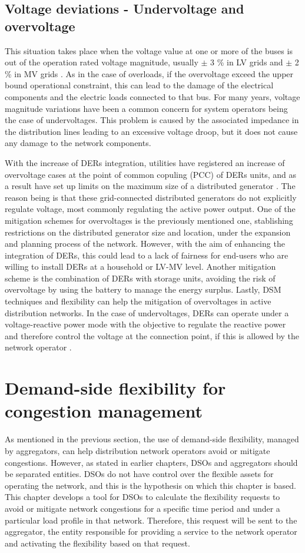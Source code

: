 \subsection{Voltage deviations - Undervoltage and overvoltage}
This situation takes place when the voltage value at one or more of the buses is out of the operation rated voltage magnitude, usually $\pm$ 3 \% in LV grids and $\pm$ 2 \% in MV grids \cite{BAYER2020336}. As in the case of overloads, if the overvoltage exceed the upper bound operational constraint, this can lead to the damage of the electrical components and the electric loads connected to that bus. 
For many years, voltage magnitude variations have been a common concern for system operators being the case of undervoltages. This problem is caused by the associated impedance in the distribution lines leading to an excessive voltage droop, but it does not cause any damage to the network components.  

With the increase of DERs integration, utilities have registered an increase of overvoltage cases at the point of common copuling (PCC) of DERs units, and as a result have set up limits on the maximum size of a distributed generator \cite{Kennedy2014}. The reason being is that these grid-connected distributed generators do not explicitly regulate voltage, most commonly regulating the active power output. One of the mitigation schemes for overvoltages is the previously mentioned one, stablishing restrictions on the distributed generator size and location, under the expansion and planning process of the network. However, with the aim of enhancing the integration of DERs, this could lead to a lack of fairness for end-users who are willing to install DERs at a household or LV-MV level. Another mitigation scheme is the combination of DERs with storage units, avoiding the risk of overvoltage by using the battery to manage the energy surplus. Lastly, DSM techniques and flexibility can help the mitigation of overvoltages in active distribution networks. In the case of undervoltages, DERs can operate under a voltage-reactive power mode with the objective to regulate the reactive power and therefore control the voltage at the connection point, if this is allowed by the network operator \cite{interconnection_ders}. 

\section{Demand-side flexibility for congestion management}
As mentioned in the previous section, the use of demand-side flexibility, managed by aggregators, can help distribution network operators avoid or mitigate congestions. However, as stated in earlier chapters, DSOs and aggregators should be separated entities. DSOs do not have control over the flexible assets for operating the network, and this is the hypothesis on which this chapter is based. This chapter develops a tool for DSOs to calculate the flexibility requests to avoid or mitigate network congestions for a specific time period and under a particular load profile in that network. Therefore, this request will be sent to the aggregator, the entity responsible for providing a service to the network operator and activating the flexibility based on that request. 

